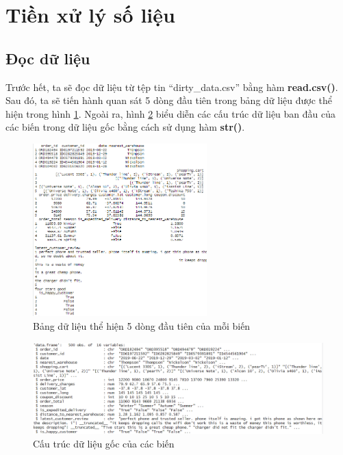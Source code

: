 \section{Tiền xử lý số liệu}
\subsection{Đọc dữ liệu}
Trước hết, ta sẽ đọc dữ liệu từ tệp tin ``dirty\_data.csv'' bằng hàm \textbf{read.csv()}. Sau đó, ta sẽ tiến hành quan sát 5 dòng đầu tiên trong bảng dữ liệu được thể hiện trong hình \ref{fig:3.1}. Ngoài ra, hình \ref{fig:3.2} biểu diễn các cấu trúc dữ liệu ban đầu của các biến trong dữ liệu gốc bằng cách sử dụng hàm \textbf{str()}.
\begin{figure}[!htbp]
    \centering
    \includegraphics[width=0.6\textwidth]{graphics/Pre_processing_data/f8.PNG}
    \caption{Bảng dữ liệu thể hiện 5 dòng đầu tiên của mỗi biến}
    \label{fig:3.1}
\end{figure}
\clearpage
\begin{figure}[!htbp]
    \centering
    \includegraphics[width=1\textwidth]{graphics/Pre_processing_data/f9.PNG}
    \caption{Cấu trúc dữ liệu gốc của các biến}
    \label{fig:3.2}
\end{figure}

